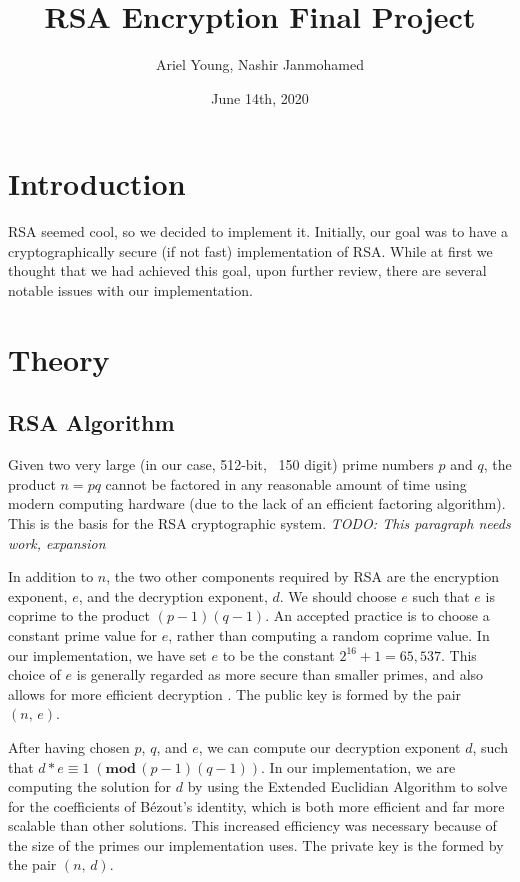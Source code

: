 \documentclass{article}
\title{RSA Encryption Final Project}
\author{Ariel Young, Nashir Janmohamed}
\date{June 14th, 2020}
\begin{document}
\maketitle
\tableofcontents

\section{Introduction}
RSA seemed cool, so we decided to implement it. Initially, our goal was to have a cryptographically secure (if not fast) implementation of RSA. While at first we thought that we had achieved this goal, upon further review, there are several notable issues with our implementation.
\section{Theory}

\subsection{RSA Algorithm}
Given two very large (in our case, 512-bit, ~150 digit) prime numbers $p$ and $q$, the product $n = pq$ cannot be factored in any reasonable amount of time using modern computing hardware (due to the lack of an efficient factoring algorithm). This is the basis for the RSA cryptographic system. \textit{TODO: This paragraph needs work, expansion}

In addition to $n$, the two other components required by RSA are the encryption exponent, $e$, and the decryption exponent, $d$. We should choose $e$ such that $e$ is coprime to the product $(p - 1)(q - 1)$. An accepted practice is to choose a constant prime value for $e$, rather than computing a random coprime value. In our implementation, we have set $e$ to be the constant $2^{16} + 1 = 65,537$. This choice of $e$ is generally regarded as more secure than smaller primes, and also allows for more efficient decryption \cite{rsa_attacks}. The public key is formed by the pair $(n,\, e)$.

After having chosen $p$, $q$, and $e$, we can compute our decryption exponent $d$, such that $d*e \equiv 1 \;(\textbf{mod}\,(p - 1)(q - 1))$. In our implementation, we are computing the solution for $d$ by using the Extended Euclidian Algorithm to solve for the coefficients of Bézout's identity, which is both more efficient and far more scalable than other solutions. This increased efficiency was necessary because of the size of the primes our implementation uses. The private key is the formed by the pair $(n,\, d)$.
\end{document}
